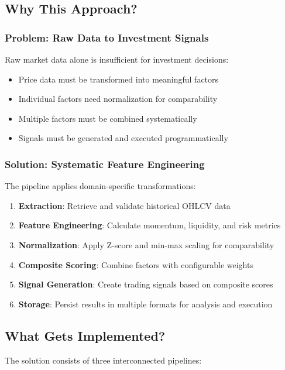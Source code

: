\documentclass[11pt, a4paper, twoside]{article}
\begin{document}
\subsection{Why This Approach?}

\subsubsection{Problem: Raw Data to Investment Signals}

Raw market data alone is insufficient for investment decisions:
\begin{itemize}
    \item Price data must be transformed into meaningful factors
    \item Individual factors need normalization for comparability
    \item Multiple factors must be combined systematically
    \item Signals must be generated and executed programmatically
\end{itemize}

\subsubsection{Solution: Systematic Feature Engineering}

The pipeline applies domain-specific transformations:
\begin{enumerate}
    \item \textbf{Extraction}: Retrieve and validate historical OHLCV data
    \item \textbf{Feature Engineering}: Calculate momentum, liquidity, and risk metrics
    \item \textbf{Normalization}: Apply Z-score and min-max scaling for comparability
    \item \textbf{Composite Scoring}: Combine factors with configurable weights
    \item \textbf{Signal Generation}: Create trading signals based on composite scores
    \item \textbf{Storage}: Persist results in multiple formats for analysis and execution
\end{enumerate}

\subsection{What Gets Implemented?}

The solution consists of three interconnected pipelines:
\end{document}
